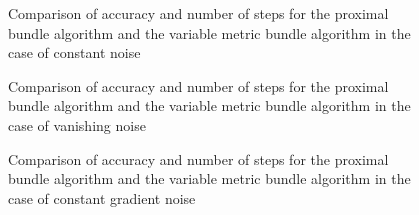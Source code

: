 \vspace{-1.5em}

\begin{figure}[H]
	\begin{subfigure}{0.49\textwidth}
	\end{subfigure}
	\begin{subfigure}{0.49\textwidth}
	\end{subfigure}
	\vspace{-.5em}
	\caption{Comparison of accuracy and number of steps for the proximal bundle algorithm and the variable metric bundle algorithm in the case of constant noise}%
	\label{fig_const_noise_large}%
\end{figure}

\vspace{-1.5em}

\begin{figure}[H]
	\begin{subfigure}{0.49\textwidth}
	\end{subfigure}
	\begin{subfigure}{0.49\textwidth}
	\end{subfigure}
	\caption{Comparison of accuracy and number of steps for the proximal bundle algorithm and the variable metric bundle algorithm in the case of vanishing noise}%
	\label{fig_van_noise_large}%
\end{figure}

\vspace{-1.5em}

\begin{figure}[H]
	\begin{subfigure}{0.49\textwidth}
	\end{subfigure}
	\begin{subfigure}{0.49\textwidth}
	\end{subfigure}
	\caption{Comparison of accuracy and number of steps for the proximal bundle algorithm and the variable metric bundle algorithm in the case of constant gradient noise}%
	\label{fig_const_grad_noise_large}%
\end{figure}


